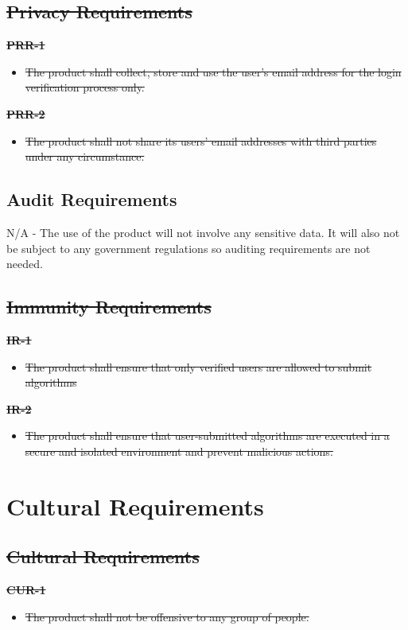 \documentclass[12pt]{article}
\begin{document}
\subsection{\sout{Privacy Requirements}}
\textbf{\sout{PRR-1}}
\begin{itemize}
    \item \sout{The product shall collect, store and use the user’s email address for the login verification process only.}
\end{itemize}
\textbf{\sout{PRR-2}}
\begin{itemize}
    \item \sout{The product shall not share its users’ email addresses with third parties under any circumstance. }
\end{itemize}
\subsection{Audit Requirements}
N/A - The use of the product will not involve any sensitive data. It will also not be subject to any government regulations so auditing requirements are not needed.

\subsection{\sout{Immunity Requirements}}
\textbf{\sout{IR-1}}
\begin{itemize}
    \item \sout{The product shall ensure that only verified users are allowed to submit algorithms}
\end{itemize}
\textbf{\sout{IR-2}}
\begin{itemize}
    \item \sout{The product shall ensure that user-submitted algorithms are executed in a secure and isolated environment and prevent malicious actions.}
\end{itemize}

\section{Cultural Requirements}
\subsection{\sout{Cultural Requirements}}
\textbf{\sout{CUR-1}}
\begin{itemize}
    \item \sout{The product shall not be offensive to any group of people.}
\end{itemize}
\end{document}
